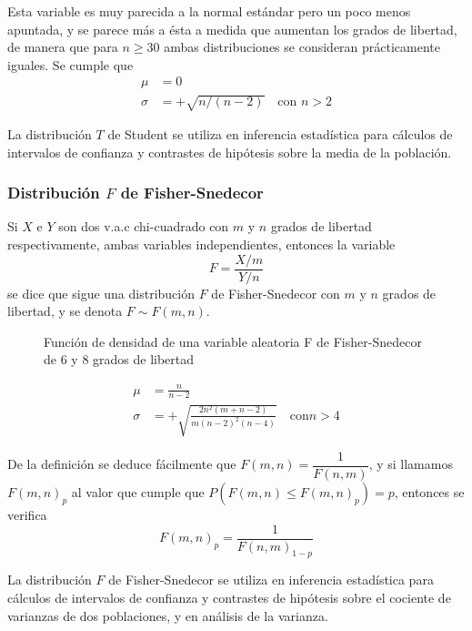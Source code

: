Esta variable es muy parecida a la normal estándar pero un poco menos apuntada, y se parece más a ésta a medida que
aumentan los grados de libertad, de manera que para $n\geq 30$ ambas distribuciones se consideran prácticamente iguales.
Se cumple que
\begin{align*}
\mu &= 0\\
\sigma &=+\sqrt{n/(n-2)}\quad \textrm{con } n>2
\end{align*}

La distribución $T$ de Student se utiliza en inferencia estadística para cálculos de intervalos de confianza y
contrastes de hipótesis sobre la media de la población.

\subsubsection{Distribución $F$ de Fisher-Snedecor}
Si $X$ e $Y$ son dos v.a.c chi-cuadrado con $m$ y $n$ grados de libertad respectivamente, ambas variables
independientes, entonces la variable
\[
F=\frac{X/m}{Y/n}
\]
se dice que sigue una distribución $F$ de Fisher-Snedecor con $m$ y $n$ grados de libertad, y se denota $F\sim F(m,n)$.

\begin{figure}[h!]
\centering
\scalebox{0.8}{} 
\caption{Función de densidad de una variable aleatoria F de Fisher-Snedecor de 6 y 8 grados de libertad}
\label{g:ffisher}
\end{figure}

\begin{align*}
\mu &= \frac{n}{n-2}\\
\sigma &=+\sqrt{\frac{2n^2(m+n-2)}{m(n-2)^2(n-4)}}\quad \textrm{con
} n>4
\end{align*}

De la definición se deduce fácilmente que $F(m,n)=\dfrac{1}{F(n,m)}$, y si llamamos $F(m,n)_p$ al valor que cumple
que $P(F(m,n)\leq F(m,n)_p)=p$, entonces se verifica
\[
F(m,n)_p = \frac{1}{F(n,m)_{1-p}}
\]

La distribución $F$ de Fisher-Snedecor se utiliza en inferencia estadística para cálculos de intervalos
de confianza y contrastes de hipótesis sobre el cociente de varianzas de dos poblaciones, y en análisis de la varianza.

\clearpage
\newpage

